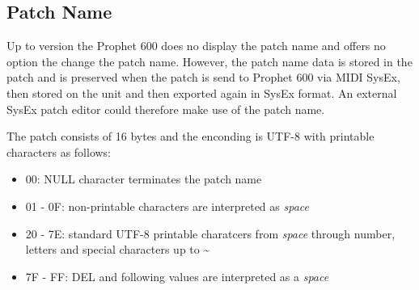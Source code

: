 \subsection{Patch Name}

Up to version \version the Prophet 600 does no display the patch name and offers no option the change the patch name. However, the patch name data is stored in the patch and is preserved when the patch is send to Prophet 600 via MIDI SysEx, then stored on the unit and then exported again in SysEx format. An external SysEx patch editor could therefore make use of the patch name.

The patch consists of 16 bytes and the enconding is UTF-8 with printable characters as follows:

\begin{itemize}
  \item 00: NULL character terminates the patch name
  \item 01 - 0F: non-printable characters are interpreted as \textit{space}
  \item 20 - 7E: standard UTF-8 printable charatcers from \textit{space} through number, letters and special characters up to \textasciitilde
  \item 7F - FF: DEL and following values are interpreted as a \textit{space}
\end{itemize}
 
